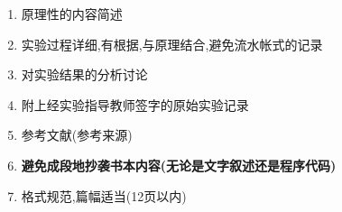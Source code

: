 \begin{enumerate}
  \item 原理性的内容简述
  \item 实验过程详细,有根据,与原理结合,避免流水帐式的记录
  \item 对实验结果的分析讨论
  \item 附上经实验指导教师签字的原始实验记录
  \item 参考文献(参考来源)
  \item {\bf 避免成段地抄袭书本内容(无论是文字叙述还是程序代码)}
  \item 格式规范,篇幅适当(12页以内)
\end{enumerate}
\endslide
